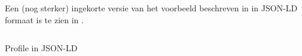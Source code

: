 Een (nog sterker) ingekorte versie van het voorbeeld beschreven in  in JSON-LD formaat is te zien in .

\begin{listing}[ht]
    \inputminted{json}{data/profile_short.jsonld}
    \caption{Profile in JSON-LD}
    \label{listing:profile_jsonld}
\end{listing}